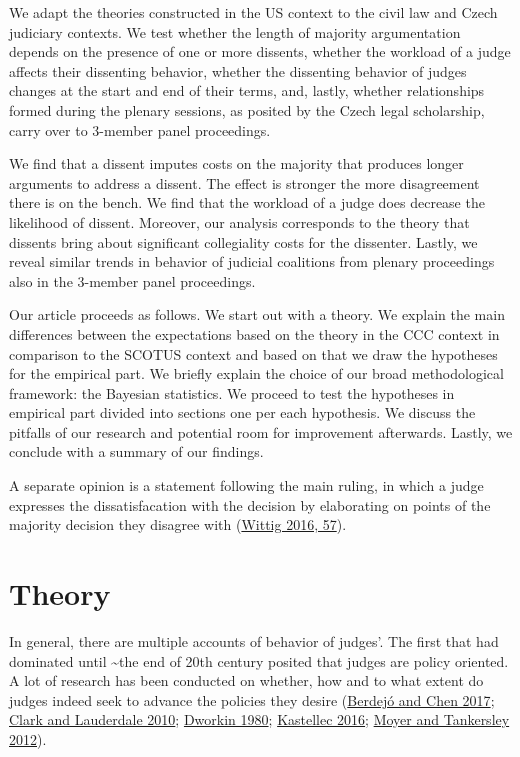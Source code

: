\documentclass[
  11pt,
]{article}
\begin{document}
We adapt the theories constructed in the US context to the civil law and
Czech judiciary contexts. We test whether the length of majority
argumentation depends on the presence of one or more dissents, whether
the workload of a judge affects their dissenting behavior, whether the
dissenting behavior of judges changes at the start and end of their
terms, and, lastly, whether relationships formed during the plenary
sessions, as posited by the Czech legal scholarship, carry over to
3-member panel proceedings.

We find that a dissent imputes costs on the majority that produces
longer arguments to address a dissent. The effect is stronger the more
disagreement there is on the bench. We find that the workload of a judge
does decrease the likelihood of dissent. Moreover, our analysis
corresponds to the theory that dissents bring about significant
collegiality costs for the dissenter. Lastly, we reveal similar trends
in behavior of judicial coalitions from plenary proceedings also in the
3-member panel proceedings.

Our article proceeds as follows. We start out with a theory. We explain
the main differences between the expectations based on the theory in the
CCC context in comparison to the SCOTUS context and based on that we
draw the hypotheses for the empirical part. We briefly explain the
choice of our broad methodological framework: the Bayesian statistics.
We proceed to test the hypotheses in empirical part divided into
sections one per each hypothesis. We discuss the pitfalls of our
research and potential room for improvement afterwards. Lastly, we
conclude with a summary of our findings.

A separate opinion is a statement following the main ruling, in which a
judge expresses the dissatisfacation with the decision by elaborating on
points of the majority decision they disagree with
(\protect\hyperlink{ref-wittigOccurrenceSeparateOpinions2016}{Wittig
2016, 57}).

\hypertarget{theory}{%
\section{Theory}\label{theory}}

In general, there are multiple accounts of behavior of judges'. The
first that had dominated until \textasciitilde the end of 20th century
posited that judges are policy oriented. A lot of research has been
conducted on whether, how and to what extent do judges indeed seek to
advance the policies they desire
(\protect\hyperlink{ref-berdejoElectoralCyclesUS2017}{Berdejó and Chen
2017}; \protect\hyperlink{ref-clarkLocatingSupremeCourt2010}{Clark and
Lauderdale 2010};
\protect\hyperlink{ref-dworkinPoliticalJudgesRule1980}{Dworkin 1980};
\protect\hyperlink{ref-kastellecEmpiricallyEvaluatingCountermajoritarian2016}{Kastellec
2016}; \protect\hyperlink{ref-moyerJudicialInnovationSexual2012}{Moyer
and Tankersley 2012}).
\end{document}
